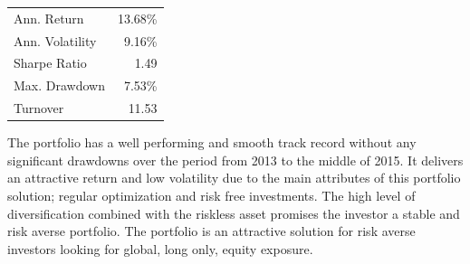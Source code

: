\documentclass[11pt, parskip=full, DIV=14]{scrreprt}
\begin{document}
\vspace{\abovedisplayskip}
\begin{minipage}{0.65\textwidth}
\end{minipage}
\begin{minipage}{0.35\textwidth}
\begin{tabular}{lr}
\toprule
Ann. Return & 13.68\%\\
Ann. Volatility & 9.16\%\\
Sharpe Ratio & 1.49 \\
Max. Drawdown & 7.53\% \\
Turnover & 11.53\\
\bottomrule
\end{tabular}
\end{minipage}

The portfolio has a well performing and smooth track record without any significant drawdowns over the period from 2013 to the middle of 2015.
It delivers an attractive return and low volatility due to the main attributes of this portfolio solution; regular optimization and risk free investments.
The high level of diversification combined with the riskless asset promises the investor a stable and risk averse portfolio.
The portfolio is an attractive solution for risk averse investors looking for global, long only, equity exposure.
 
\end{document}
